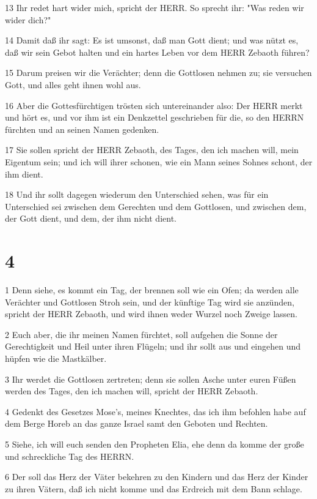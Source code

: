 \par 13 Ihr redet hart wider mich, spricht der HERR. So sprecht ihr: "Was reden wir wider dich?"
\par 14 Damit daß ihr sagt: Es ist umsonst, daß man Gott dient; und was nützt es, daß wir sein Gebot halten und ein hartes Leben vor dem HERR Zebaoth führen?
\par 15 Darum preisen wir die Verächter; denn die Gottlosen nehmen zu; sie versuchen Gott, und alles geht ihnen wohl aus.
\par 16 Aber die Gottesfürchtigen trösten sich untereinander also: Der HERR merkt und hört es, und vor ihm ist ein Denkzettel geschrieben für die, so den HERRN fürchten und an seinen Namen gedenken.
\par 17 Sie sollen spricht der HERR Zebaoth, des Tages, den ich machen will, mein Eigentum sein; und ich will ihrer schonen, wie ein Mann seines Sohnes schont, der ihm dient.
\par 18 Und ihr sollt dagegen wiederum den Unterschied sehen, was für ein Unterschied sei zwischen dem Gerechten und dem Gottlosen, und zwischen dem, der Gott dient, und dem, der ihm nicht dient.

\chapter{4}

\par 1 Denn siehe, es kommt ein Tag, der brennen soll wie ein Ofen; da werden alle Verächter und Gottlosen Stroh sein, und der künftige Tag wird sie anzünden, spricht der HERR Zebaoth, und wird ihnen weder Wurzel noch Zweige lassen.
\par 2 Euch aber, die ihr meinen Namen fürchtet, soll aufgehen die Sonne der Gerechtigkeit und Heil unter ihren Flügeln; und ihr sollt aus und eingehen und hüpfen wie die Mastkälber.
\par 3 Ihr werdet die Gottlosen zertreten; denn sie sollen Asche unter euren Füßen werden des Tages, den ich machen will, spricht der HERR Zebaoth.
\par 4 Gedenkt des Gesetzes Mose's, meines Knechtes, das ich ihm befohlen habe auf dem Berge Horeb an das ganze Israel samt den Geboten und Rechten.
\par 5 Siehe, ich will euch senden den Propheten Elia, ehe denn da komme der große und schreckliche Tag des HERRN.
\par 6 Der soll das Herz der Väter bekehren zu den Kindern und das Herz der Kinder zu ihren Vätern, daß ich nicht komme und das Erdreich mit dem Bann schlage.

